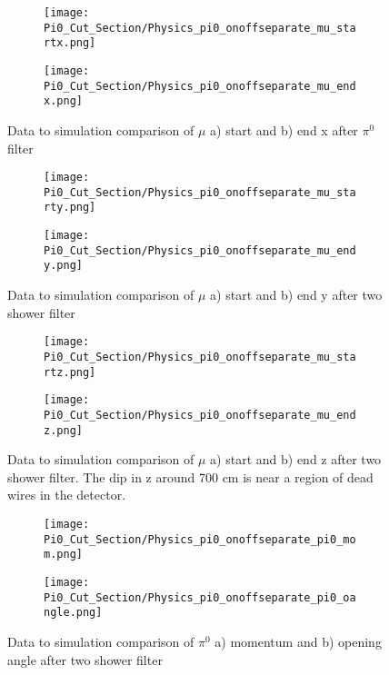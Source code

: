 \begin{figure}[H]
  \begin{subfigure}[t]{0.3\textwidth}
\texttt{[image: Pi0\_Cut\_Section/Physics\_pi0\_onoffseparate\_mu\_startx.png]}
  \caption{ }
  \end{subfigure} 
  \hspace{32mm}
  \begin{subfigure}[t]{0.3\textwidth}
\texttt{[image: Pi0\_Cut\_Section/Physics\_pi0\_onoffseparate\_mu\_endx.png]}
  \caption{ }
  \end{subfigure} 
\caption{ Data to simulation comparison of $\mu$ a) start and b) end x after $\pi^0$ filter }
\label{fig:physics_pi0_mu_x}
\end{figure}

\begin{figure}[H]
  \begin{subfigure}[t]{0.3\textwidth}
\texttt{[image: Pi0\_Cut\_Section/Physics\_pi0\_onoffseparate\_mu\_starty.png]}
  \caption{ }
  \end{subfigure} 
  \hspace{32mm}
  \begin{subfigure}[t]{0.3\textwidth}
\texttt{[image: Pi0\_Cut\_Section/Physics\_pi0\_onoffseparate\_mu\_endy.png]}
  \caption{ }
  \end{subfigure} 
\caption{ Data to simulation comparison of $\mu$ a) start and b) end y after two shower filter }
\label{fig:physics_pi0_mu_y}
\end{figure}

\begin{figure}[H]
  \begin{subfigure}[t]{0.3\textwidth}
\texttt{[image: Pi0\_Cut\_Section/Physics\_pi0\_onoffseparate\_mu\_startz.png]}
  \caption{ }
  \end{subfigure} 
  \hspace{32mm}
  \begin{subfigure}[t]{0.3\textwidth}
\texttt{[image: Pi0\_Cut\_Section/Physics\_pi0\_onoffseparate\_mu\_endz.png]}
  \caption{ }
  \end{subfigure} 
\caption{ Data to simulation comparison of $\mu$ a) start and b) end z after two shower filter.  The dip in z around 700 cm is near a region of dead wires in the detector. }
\label{fig:physics_pi0_mu_z}
\end{figure}

\begin{figure}[H]
  \begin{subfigure}[t]{0.3\textwidth}
\texttt{[image: Pi0\_Cut\_Section/Physics\_pi0\_onoffseparate\_pi0\_mom.png]}
  \caption{ }
  \end{subfigure} 
  \hspace{30mm}
  \begin{subfigure}[t]{0.3\textwidth}
\texttt{[image: Pi0\_Cut\_Section/Physics\_pi0\_onoffseparate\_pi0\_oangle.png]} 
  \caption{ }
  \end{subfigure} 
\label{fig:physics_pi0_pi0_oangle}
\caption{ Data to simulation comparison of $\pi^0$ a) momentum and b) opening angle after two shower filter }
\end{figure}

